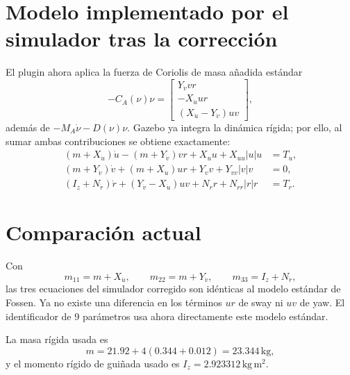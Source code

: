 \documentclass[11pt,a4paper]{article}
\begin{document}
\section{Modelo implementado por el simulador tras la corrección}
El plugin ahora aplica la fuerza de Coriolis de masa añadida estándar
\begin{equation}
-C_A(\nu)\nu=
\begin{bmatrix}
 Y_{\dot v}vr\\
 -X_{\dot u}ur\\
 (X_{\dot u}-Y_{\dot v})uv
\end{bmatrix},
\end{equation}
además de $-M_A\dot\nu-D(\nu)\nu$. Gazebo ya integra la dinámica rígida; por ello, al sumar ambas contribuciones se obtiene exactamente:
\begin{align}
 (m+X_{\dot u})\dot u -(m+Y_{\dot v})vr
   +X_u u+X_{uu}|u|u &= T_u, \\
 (m+Y_{\dot v})\dot v +(m+X_{\dot u})ur
   +Y_v v+Y_{vv}|v|v &= 0, \\
 (I_z+N_{\dot r})\dot r +(Y_{\dot v}-X_{\dot u})uv
   +N_r r+N_{rr}|r|r &= T_r.
\end{align}

\section{Comparación actual}
Con
\begin{equation}
m_{11}=m+X_{\dot u},\qquad m_{22}=m+Y_{\dot v},\qquad
m_{33}=I_z+N_{\dot r},
\end{equation}
las tres ecuaciones del simulador corregido son idénticas al modelo estándar de Fossen. Ya no existe una diferencia en los términos $ur$ de sway ni $uv$ de yaw. El identificador de 9 parámetros usa ahora directamente este modelo estándar.

La masa rígida usada es
\begin{equation}
m=21.92+4(0.344+0.012)=23.344\,\mathrm{kg},
\end{equation}
y el momento rígido de guiñada usado es $I_z=2.923312\,\mathrm{kg\,m^2}$.
\end{document}
